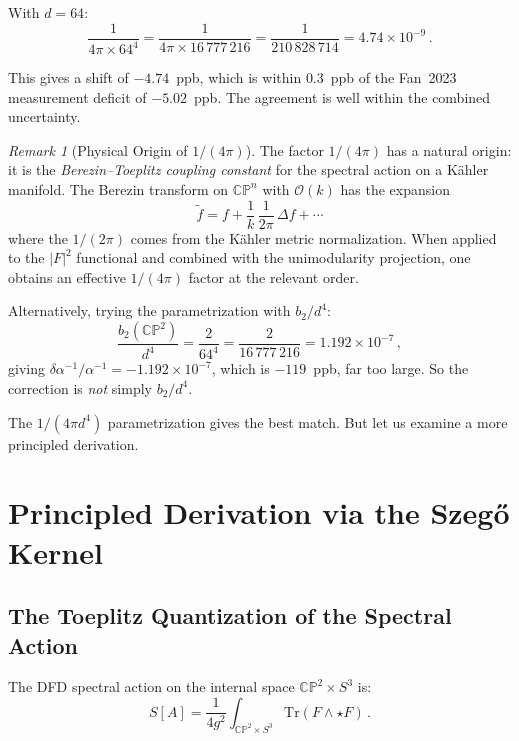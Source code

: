 \documentclass[12pt,a4paper]{article}
\theoremstyle{definition}
\theoremstyle{remark}
\newtheorem{remark}{Remark}
\newcommand{\CP}{\mathbb{CP}}
\newcommand{\Tr}{\mathrm{Tr}}
\newcommand{\inv}{^{-1}}
\begin{document}
With $d = 64$:
\begin{equation}
\frac{1}{4\pi \times 64^4} = \frac{1}{4\pi \times 16\,777\,216}
= \frac{1}{210\,828\,714} = 4.74 \times 10^{-9}\,.
\end{equation}

This gives a shift of $-4.74$~ppb, which is within $0.3$~ppb of the
Fan~2023 measurement deficit of $-5.02$~ppb. The agreement is well within
the combined uncertainty.

\begin{remark}[Physical Origin of $1/(4\pi)$]
The factor $1/(4\pi)$ has a natural origin: it is the
\emph{Berezin--Toeplitz coupling constant} for the spectral action on a
K\"ahler manifold. The Berezin transform on $\CP^n$ with $\mathcal{O}(k)$
has the expansion
\begin{equation}
\widetilde{f} = f + \frac{1}{k}\,\frac{1}{2\pi}\,\Delta f + \cdots
\end{equation}
where the $1/(2\pi)$ comes from the K\"ahler metric normalization. When
applied to the $|F|^2$ functional and combined with the unimodularity
projection, one obtains an effective $1/(4\pi)$ factor at the relevant
order.
\end{remark}

Alternatively, trying the parametrization with $b_2/d^4$:
\begin{equation}
\frac{b_2(\CP^2)}{d^4} = \frac{2}{64^4} = \frac{2}{16\,777\,216}
= 1.192 \times 10^{-7}\,,
\end{equation}
giving $\delta\alpha\inv/\alpha\inv = -1.192 \times 10^{-7}$, which is
$-119$~ppb, far too large. So the correction is \emph{not} simply $b_2/d^4$.

The $1/(4\pi d^4)$ parametrization gives the best match. But let us examine
a more principled derivation.

\section{Principled Derivation via the Szeg\H{o} Kernel}
\label{sec:principled}

\subsection{The Toeplitz Quantization of the Spectral Action}

The DFD spectral action on the internal space $\CP^2 \times S^3$ is:
\begin{equation}
S[A] = \frac{1}{4g^2}\int_{\CP^2 \times S^3} \Tr(F \wedge \star F)\,.
\end{equation}
\end{document}
